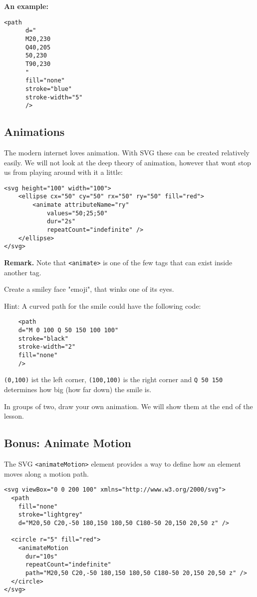 \documentclass[11pt,a4paper]{report}
\begin{document}
{\bf An example:}
\begin{multicols}{2}
\begin{lstlisting}
<path 
      d="
      M20,230 
      Q40,205 
      50,230 
      T90,230
      " 
      fill="none" 
      stroke="blue" 
      stroke-width="5"
      />
\end{lstlisting}
\columnbreak

\end{multicols}

\newpage
\subsection{Animations}
The modern internet loves animation. With SVG these can be created relatively easily. We will not look at the deep theory of animation, however that wont stop us from playing around with it a little:

\begin{lstlisting}
<svg height="100" width="100">
    <ellipse cx="50" cy="50" rx="50" ry="50" fill="red">
        <animate attributeName="ry"
            values="50;25;50"
            dur="2s"
            repeatCount="indefinite" />
    </ellipse>
</svg>
\end{lstlisting}

{\bf Remark.} Note that \verb|<animate>| is one of the few tags that can exist inside another tag.

\begin{ex}
Create a smiley face "emoji", that winks one of its eyes.

Hint: A curved path for the smile could have the following code:
\begin{lstlisting}
    <path 
    d="M 0 100 Q 50 150 100 100" 
    stroke="black" 
    stroke-width="2" 
    fill="none"
    />
\end{lstlisting}
\verb|(0,100)| ist the left corner, \verb|(100,100)| is the right corner and \verb|Q 50 150| determines how big (how far down) the smile is.
\end{ex}

\begin{ex}
In groups of two, draw your own animation. We will show them at the end of the lesson.
\end{ex}

\newpage
\subsection{Bonus: Animate Motion}

The SVG \verb|<animateMotion>| element provides a way to define how an element moves along a motion path.

\begin{lstlisting}
<svg viewBox="0 0 200 100" xmlns="http://www.w3.org/2000/svg">
  <path
    fill="none"
    stroke="lightgrey"
    d="M20,50 C20,-50 180,150 180,50 C180-50 20,150 20,50 z" />

  <circle r="5" fill="red">
    <animateMotion
      dur="10s"
      repeatCount="indefinite"
      path="M20,50 C20,-50 180,150 180,50 C180-50 20,150 20,50 z" />
  </circle>
</svg>
\end{lstlisting}
\end{document}
